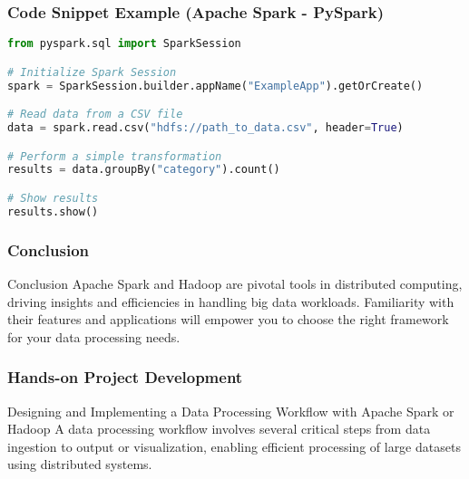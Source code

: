 \documentclass[aspectratio=169]{beamer}
\begin{document}
\begin{frame}[fragile]
    \frametitle{Code Snippet Example (Apache Spark - PySpark)}

    \begin{lstlisting}[language=Python]
from pyspark.sql import SparkSession

# Initialize Spark Session
spark = SparkSession.builder.appName("ExampleApp").getOrCreate()

# Read data from a CSV file
data = spark.read.csv("hdfs://path_to_data.csv", header=True)

# Perform a simple transformation
results = data.groupBy("category").count()

# Show results
results.show()
    \end{lstlisting}
\end{frame}

\begin{frame}[fragile]
    \frametitle{Conclusion}

    \begin{block}{Conclusion}
        Apache Spark and Hadoop are pivotal tools in distributed computing, driving insights and efficiencies in handling big data workloads. Familiarity with their features and applications will empower you to choose the right framework for your data processing needs.
    \end{block}
\end{frame}

\begin{frame}[fragile]
    \frametitle{Hands-on Project Development}
    \begin{block}{Designing and Implementing a Data Processing Workflow with Apache Spark or Hadoop}
        A data processing workflow involves several critical steps from data ingestion to output or visualization, enabling efficient processing of large datasets using distributed systems.
    \end{block}
\end{frame}
\end{document}
